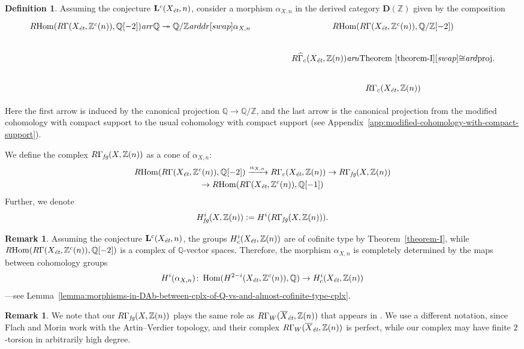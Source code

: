 \documentclass[leqno,12pt]{article}
\theoremstyle{plain}
\theoremstyle{definition}
\newtheorem{definition}[theorem]{\indent\sc Definition}
\newtheorem{remark}[theorem]{\indent\sc Remark}
\DeclareMathOperator{\Hom}{Hom}
\newcommand{\QQ}{\mathbb{Q}}
\newcommand{\ZZ}{\mathbb{Z}}
\newcommand{\dfn}{\mathrel{\mathop:}=}
\newcommand{\ar}{\text{\it ar}}
\newcommand{\et}{\text{\it \'{e}t}}
\newcommand{\fg}{\text{\it fg}}
\newcommand{\RHom}{R\!\Hom}
\newcommand{\DZ}{{\mathbf{D} (\ZZ)}}
\begin{document}
\begin{definition}
  \label{def:RGamma-fg}
  Assuming the conjecture $\mathbf{L}^c (X_\et,n)$, consider a morphism
  $\alpha_{X,n}$ in the derived category $\DZ$ given by the
  composition
  \[ \begin{tikzcd}[column sep=4em]
    \RHom (R\Gamma (X_\et, \ZZ^c (n)), \QQ[-2]) \ar{r}{\QQ \twoheadrightarrow \QQ/\ZZ}\ar{ddr}[swap]{\alpha_{X,n}} & \RHom (R\Gamma (X_\et, \ZZ^c (n)), \QQ/\ZZ[-2]) \\
    & R\widehat{\Gamma}_c (X_\et, \ZZ (n)) \ar{u}{\text{Theorem~\ref{theorem-I}}}[swap]{\cong} \ar{d}{\text{proj.}} \\
    & R\Gamma_c (X_\et, \ZZ (n))
  \end{tikzcd} \]

  Here the first arrow is induced by the canonical projection $\QQ \to \QQ/\ZZ$,
  and the last arrow is the canonical projection from the modified cohomology
  with compact support to the usual cohomology with compact support
  (see Appendix~\ref{app:modified-cohomology-with-compact-support}).

  We define the complex $R\Gamma_\fg (X, \ZZ(n))$ as a cone of $\alpha_{X,n}$:
  \begin{multline*}
    \RHom (R\Gamma (X_\et, \ZZ^c (n)), \QQ [-2]) \xrightarrow{\alpha_{X,n}}
    R\Gamma_c (X_\et, \ZZ (n)) \to
    R\Gamma_\fg (X, \ZZ(n)) \\
    \to \RHom (R\Gamma (X_\et, \ZZ^c (n)), \QQ [-1])
  \end{multline*}
  Further, we denote
  $$H^i_\fg (X, \ZZ (n)) \dfn H^i (R\Gamma_\fg (X, \ZZ (n))).$$
\end{definition}

\begin{remark}
  \label{rmk:alpha-X-n-determined-by-cohomology}
  Assuming the conjecture $\mathbf{L}^c (X_\et, n)$, the groups
  $H^i_c (X_\et, \ZZ (n))$ are of cofinite type by Theorem~\ref{theorem-I},
  while $\RHom (R\Gamma (X_\et, \ZZ^c (n)), \QQ [-2])$ is a complex of
  $\QQ$-vector spaces. Therefore, the morphism $\alpha_{X,n}$ is completely
  determined by the maps between cohomology groups
  \[ H^i (\alpha_{X,n})\colon
    \Hom (H^{2-i} (X_\et, \ZZ^c (n)), \QQ) \to
    H^i_c (X_\et, \ZZ (n)) \]
  ---see Lemma~\ref{lemma:morphisms-in-DAb-between-cplx-of-Q-vs-and-almost-cofinite-type-cplx}.
\end{remark}

\begin{remark}
  We note that our $R\Gamma_\fg (X, \ZZ (n))$ plays the same role as
  $R\Gamma_W (\overline{X}_\et, \ZZ (n))$ that appears in
  \cite[Definition~3.6]{Flach-Morin-2018}. We use a different notation, since
  Flach and Morin work with the Artin--Verdier topology, and their complex
  $R\Gamma_W (\overline{X}_\et, \ZZ (n))$ is perfect, while our complex may have
  finite $2$-torsion in arbitrarily high degree.
\end{remark}
\end{document}
